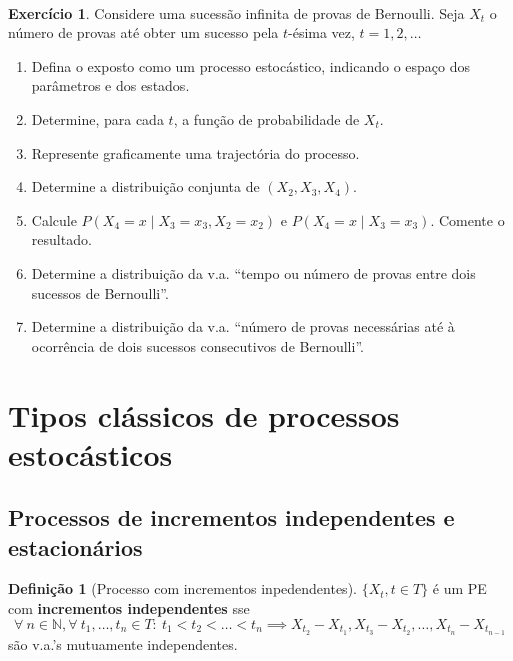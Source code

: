 \documentclass[
  11pt,
  a4paper,
]{book}
\theoremstyle{definition}
\newtheorem{definition}{Definição}[chapter]
\theoremstyle{definition}
\theoremstyle{definition}
\newtheorem{exercise}{Exercício}[chapter]
\theoremstyle{definition}
\theoremstyle{remark}
\begin{document}
\(\,\)

\begin{exercise}
\leavevmode

Considere uma sucessão infinita de provas de Bernoulli. Seja
\(X_{t}\) o número de provas até obter um sucesso pela \(t\)-ésima
vez, \(t = 1, 2, \ldots\)

\begin{enumerate}
\def\labelenumi{(\alph{enumi})}
\item
  Defina o exposto como um processo estocástico, indicando o espaço dos parâmetros e dos estados.
\item
  Determine, para cada \(t\), a função de probabilidade de \(X_{t}\).
\item
  Represente graficamente uma trajectória do processo.
\item
  Determine a distribuição conjunta de \((X_{2}, X_{3}, X_{4})\).
\item
  Calcule \(P(X_{4} = x \mid X_{3} = x_{3}, X_{2} = x_{2})\) e \(P(X_{4} = x \mid X_{3} = x_{3})\). Comente o resultado.
\item
  Determine a distribuição da v.a. ``tempo ou número de provas entre dois sucessos de Bernoulli''.
\item
  Determine a distribuição da v.a. ``número de provas necessárias até à ocorrência de dois sucessos consecutivos de Bernoulli''.
\end{enumerate}

\end{exercise}

\section{Tipos clássicos de processos estocásticos}\label{tipos-cluxe1ssicos-de-processos-estocuxe1sticos}

\subsection{Processos de incrementos independentes e estacionários}\label{processos-de-incrementos-independentes-e-estacionuxe1rios}

\begin{definition}[Processo com incrementos inpedendentes]
\(\{X_t, t \in T\}\) é um PE com \textbf{incrementos independentes} sse
\[\forall ~n \in \mathbb{N}, \forall ~t_1, \ldots,t_n \in T: ~t_1 <t_2<\ldots<t_n \implies X_{t_2}-X_{t_1}, X_{t_3}-X_{t_2},\ldots,X_{t_n}-X_{t_{n-1}}\]
são v.a.'s mutuamente independentes.
\end{definition}
\end{document}
